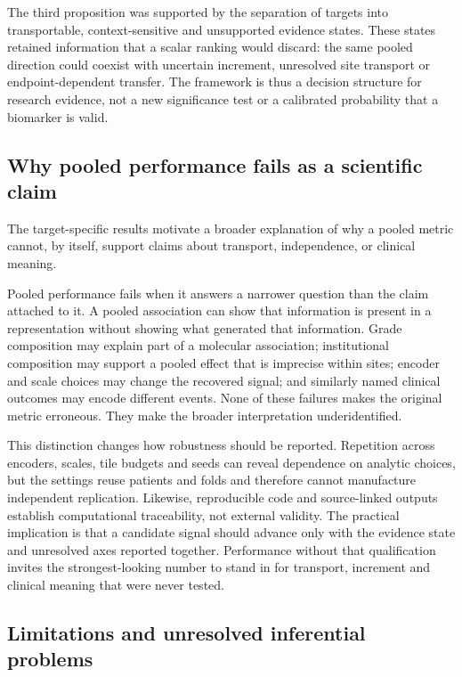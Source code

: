 The third proposition was supported by the separation of targets into transportable,
context-sensitive and unsupported evidence states. These states retained information that
a scalar ranking would discard: the same pooled direction could coexist with uncertain
increment, unresolved site transport or endpoint-dependent transfer. The framework is thus
a decision structure for research evidence, not a new significance test or a calibrated
probability that a biomarker is valid.

\subsection{Why pooled performance fails as a scientific claim}

The target-specific results motivate a broader explanation of why a pooled metric cannot, by
itself, support claims about transport, independence, or clinical meaning.

Pooled performance fails when it answers a narrower question than the claim attached to
it. A pooled association can show that information is present in a representation without
showing what generated that information. Grade composition may explain part of a molecular
association; institutional composition may support a pooled effect that is imprecise within
sites; encoder and scale choices may change the recovered signal; and similarly named
clinical outcomes may encode different events. None of these failures makes the original
metric erroneous. They make the broader interpretation underidentified.

This distinction changes how robustness should be reported. Repetition across encoders,
scales, tile budgets and seeds can reveal dependence on analytic choices, but the settings
reuse patients and folds and therefore cannot manufacture independent replication.
Likewise, reproducible code and source-linked outputs establish computational traceability,
not external validity. The practical implication is that a candidate signal should advance
only with the evidence state and unresolved axes reported together. Performance without
that qualification invites the strongest-looking number to stand in for transport,
increment and clinical meaning that were never tested.

\subsection{Limitations and unresolved inferential problems}

